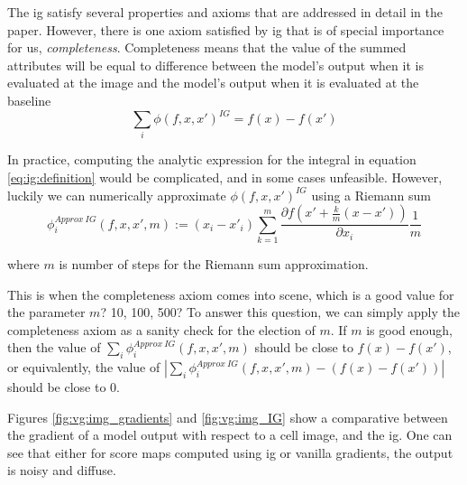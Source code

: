 The \gls{ig} satisfy several properties and axioms that are addressed in detail in the paper. However, there is one axiom satisfied by \gls{ig} that is of special importance for us, \textit{completeness}. Completeness means that the value of the summed attributes will be equal to difference between the model's output when it is evaluated at the image and the model's output when it is evaluated at the baseline
\begin{equation}
  \sum_i \phi(f, x, x')^{IG} = f(x) - f(x')
  \label{eq:ig_completeness}
\end{equation}

In practice, computing the analytic expression for the integral in equation \ref{eq:ig:definition} would be complicated, and in some cases unfeasible.
However, luckily we can numerically approximate $\phi(f, x, x')^{IG}$ using a Riemann sum
\begin{equation}
  \phi^{Approx\ IG}_i(f, x, x', m) := (x_{i} - x'_{i})\sum_{k=1}^m\frac{\partial f(x'+\frac{k}{m} (x - x'))}{\partial x_i} \frac{1}{m}
  \label{eq:ig:approx}
\end{equation}

\noindent where $m$ is number of steps for the Riemann sum approximation.

This is when the completeness axiom comes into scene, which is a good value for the parameter $m$? 10, 100, 500? To answer this question, we can simply apply the completeness axiom as a sanity check for the election of $m$. If $m$ is good enough, then the value of $\sum_i \phi^{Approx\ IG}_i(f, x, x', m)$ should be close to $f(x)-f(x')$, or equivalently, the value of $|\sum_i \phi^{Approx\ IG}_i(f, x, x', m) - (f(x)-f(x'))|$ should be close to 0.

Figures \ref{fig:vg:img_gradients} and \ref{fig:vg:img_IG} show a comparative between the gradient of a model output with respect to a cell image, and the \gls{ig}. One can see that either for score maps computed using \gls{ig} or vanilla gradients, the output is noisy and diffuse.
